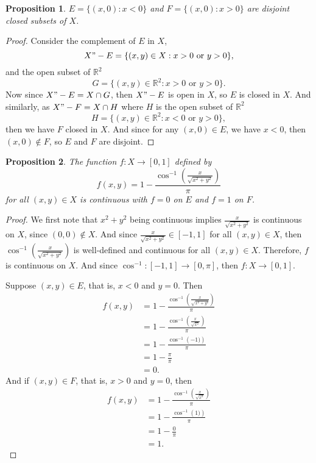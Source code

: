 \documentclass[12pt]{article}
\newtheorem{proposition}{Proposition}
\newcommand{\R}{\mathbb{R}}
\begin{document}
\begin{proposition}
    $E=\{(x,0) : x<0\}$ and $F=\{(x,0) : x>0\}$ are disjoint closed subsets of $X$.
\end{proposition}

\begin{proof}
    Consider the complement of $E$ in $X$,
    \[X"-E = \{(x,y)\in X : x>0 \text{ or } y>0\},\]
    and the open subset of $\R^2$
    \[G = \{(x,y)\in\R^2 : x>0 \text{ or } y>0\}.\]
    Now since $X"-E = X\cap G$, then $X"-E$ is open in $X$, so $E$ is closed in $X$. And similarly, as $X"-F=X\cap H$ where $H$ is the open subset of $\R^2$
    \[H = \{(x,y)\in\R^2 : x<0 \text{ or } y>0\},\]
    then we have $F$ closed in $X$. And since for any $(x,0)\in E$, we have $x<0$, then $(x,0)\notin F$, so $E$ and $F$ are disjoint.
    
\end{proof}

\begin{proposition}
    The function $f:X\to[0,1]$ defined by
    \[f(x,y) = 1-\frac{\cos^{-1}\left(\frac{x}{\sqrt{x^2+y^2}}\right)}{\pi}\]
    for all $(x,y)\in X$ is continuous with $f=0$ on $E$ and $f=1$ on $F$.
\end{proposition}

\begin{proof}
    We first note that $x^2+y^2$ being continuous implies $\frac{x}{\sqrt{x^2+y^2}}$ is continuous on $X$, since $(0,0)\notin X$. And since $\frac{x}{\sqrt{x^2+y^2}}\in[-1,1]$ for all $(x,y)\in X$, then $\cos^{-1}\left(\frac{x}{\sqrt{x^2+y^2}}\right)$ is well-defined and continuous for all $(x,y)\in X$. Therefore, $f$ is continuous on $X$. And since $\cos^{-1}:[-1,1]\to[0,\pi]$, then $f:X\to[0,1]$. 
    
    Suppose $(x,y)\in E$, that is, $x<0$ and $y=0$. Then
    \begin{align*}
        f(x,y)
            &= 1-\frac{\cos^{-1}\left(\frac{x}{\sqrt{x^2+y^2}}\right)}{\pi} \\
            &= 1-\frac{\cos^{-1}\left(\frac{x}{\sqrt{x^2}}\right)}{\pi} \\
            &= 1-\frac{\cos^{-1}\left(-1)\right)}{\pi} \\
            &= 1-\frac{\pi}{\pi} \\
            &= 0.
    \end{align*}
    And if $(x,y)\in F$, that is, $x>0$ and $y=0$, then
    \begin{align*}
        f(x,y)
            &= 1-\frac{\cos^{-1}\left(\frac{x}{\sqrt{x^2}}\right)}{\pi} \\
            &= 1-\frac{\cos^{-1}\left(1)\right)}{\pi} \\
            &= 1-\frac{0}{\pi} \\
            &= 1.
    \end{align*}
 
\end{proof}
\end{document}
